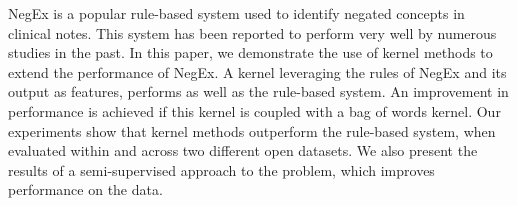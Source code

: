 NegEx is a popular rule-based system used to identify negated concepts in clinical notes. This system has been reported to perform very well by numerous studies in the past. In this paper, we demonstrate the use of kernel methods to extend the performance of NegEx. A kernel leveraging the rules of NegEx and its output as features, performs as well as the rule-based system. An improvement in performance is achieved if this kernel is coupled with a bag of words kernel. Our experiments show that kernel methods outperform the rule-based system, when evaluated within and across two different open datasets. We also present the results of a semi-supervised approach to the problem, which improves performance on the data.
